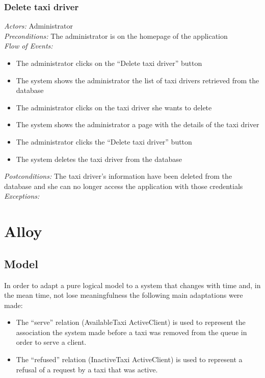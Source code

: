 \documentclass{article}
\begin{document}
\subsubsection{Delete taxi driver}
\textit{Actors:} Administrator
\\\textit{Preconditions:} The administrator is on the homepage of the application
\\\textit{Flow of Events:}
\begin{itemize}
	\item  The administrator clicks on the ``Delete taxi driver'' button
	\item  The system shows the administrator the list of taxi drivers retrieved from the database
	\item  The administrator clicks on the taxi driver she wants to delete
	\item  The system shows the administrator a page with the details of the taxi driver
	\item  The administrator clicks the ``Delete taxi driver'' button
	\item  The system deletes the taxi driver from the database
\end{itemize}
\textit{Postconditions:} The taxi driver's information have been deleted from the database and she can no longer access the application with those credentials
\\\textit{Exceptions:}
\clearpage
\section{Alloy}
\subsection{Model}
In order to adapt a pure logical model to a system that changes with time and, in the mean time, not lose meaningfulness the following
main adaptations were made:
\begin{itemize}
	\item The ``serve'' relation (AvailableTaxi \textrightarrow\-ActiveClient) is used to represent the association the system made before a taxi was removed from the queue in order to serve a client.
	\item The ``refused'' relation (InactiveTaxi \textrightarrow\-ActiveClient) is used to represent a refusal of a request by a taxi that was active.
\end{itemize}
\texttt{}	
\end{document}
